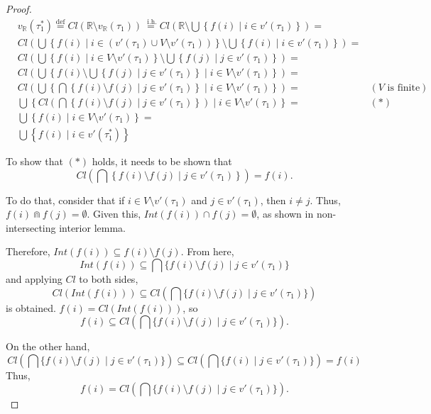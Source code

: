 \documentclass{article}
\newcommand{\R}{\mathbb{R}}
\newcommand{\bcap}{\Cap}
\newcommand{\lstar}{^*}
\newcommand{\eqdef}{\stackrel{\text{def}}{=}}
\newcommand{\eqih}{\stackrel{\text{ i.h.}}{=}}
\begin{document}
\begin{proof}
\begin{align*}
      & v_\R(\tau_1\lstar) \eqdef Cl\left(\R \setminus v_\R(\tau_1)\right) \eqih Cl\left(\R \setminus \bigcup\left\{ f(i) \mid i \in v'(\tau_1)\right\}\right) = \\
      & Cl\left(\bigcup\left\{ f(i) \mid i \in \left(v'(\tau_1) \cup V \setminus v'(\tau_1)\right)\right\} \setminus \bigcup\left\{ f(i) \mid i \in v'(\tau_1)\right\}\right) = \\
      & Cl\left(\bigcup\left\{ f(i) \mid i \in V \setminus v'(\tau_1)\right\} \setminus \bigcup\left\{ f(j) \mid j \in v'(\tau_1)\right\}\right) = \\
      & Cl\left(\bigcup \left\{ f(i) \setminus \bigcup \left\{ f(j) \mid j \in v'(\tau_1) \right\} \mid i \in V \setminus v'(\tau_1)\right\}\right) = \\
      & Cl\left(\bigcup\left\{ \bigcap\left\{ f(i) \setminus f(j) \mid j \in v'(\tau_1)\right\} \mid i \in V \setminus v'(\tau_1)\right\}\right) = & (V \text{ is finite})\\
      & \bigcup\left\{ Cl\left(\bigcap\left\{ f(i) \setminus f(j) \mid j \in v'(\tau_1)\right\}\right) \mid i \in V \setminus v'(\tau_1)\right\} = & (*)\\
      & \bigcup\left\{ f(i) \mid i \in V \setminus v'(\tau_1)\right\} = \\
      & \bigcup\left\{ f(i) \mid i \in v'(\tau_1\lstar)\right\}
    \end{align*}

    To show that $(*)$ holds, it needs to be shown that \[Cl\left(\bigcap\left\{ f(i) \setminus f(j) \mid j \in v'(\tau_1)\right\}\right) = f(i).\]

    To do that, consider that if $i \in V \setminus v'(\tau_1)$ and $j \in v'(\tau_1)$, then $i \neq j$. Thus, $f(i) \bcap f(j) = \emptyset$. Given this, $Int(f(i)) \cap f(j) = \emptyset$, as shown in non-intersecting interior lemma.

    Therefore, $Int(f(i)) \subseteq f(i) \setminus f(j)$. From here, \[Int(f(i)) \subseteq \bigcap\{ f(i) \setminus f(j) \mid j \in v'(\tau_1)\}\] and applying $Cl$ to both sides, \[Cl(Int(f(i))) \subseteq Cl\left(\bigcap \{ f(i) \setminus f(j) \mid j \in v'(\tau_1)\}\right)\] is obtained. $f(i) = Cl(Int(f(i)))$, so \[f(i) \subseteq Cl\left(\bigcap\{ f(i) \setminus f(j) \mid j \in v'(\tau_1)\}\right).\]

    On the other hand, \[Cl\left(\bigcap\{ f(i) \setminus f(j) \mid j \in v'(\tau_1)\}\right) \subseteq Cl\left(\bigcap\{ f(i) \mid j \in v'(\tau_1)\}\right) = f(i)\] Thus, \[f(i) = Cl\left(\bigcap\{ f(i) \setminus f(j) \mid j \in v'(\tau_1)\}\right).\]


\end{proof}
\end{document}

